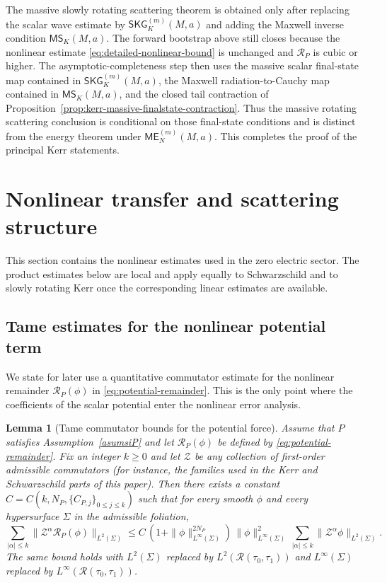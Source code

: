 \documentclass[11pt]{article}
\numberwithin{equation}{section}
\theoremstyle{plain}
\newtheorem{lemma}[theorem]{Lemma}
\theoremstyle{definition}
\theoremstyle{remark}
\newcommand{\SKG}{\mathsf{SKG}}
\newcommand{\ME}{\mathsf{ME}}
\newcommand{\MScat}{\mathsf{MS}}
\begin{document}
The massive slowly rotating scattering theorem is obtained only after replacing the scalar wave estimate by \(\SKG^{(m)}_K(M,a)\) and adding the Maxwell inverse condition \(\MScat_K(M,a)\).  The forward bootstrap above still closes because the nonlinear estimate \eqref{eq:detailed-nonlinear-bound} is unchanged and \(\mathcal R_P\) is cubic or higher.  The asymptotic-completeness step then uses the massive scalar final-state map contained in \(\SKG^{(m)}_K(M,a)\), the Maxwell radiation-to-Cauchy map contained in \(\MScat_K(M,a)\), and the closed tail contraction of Proposition~\ref{prop:kerr-massive-finalstate-contraction}.  Thus the massive rotating scattering conclusion is conditional on those final-state conditions and is distinct from the energy theorem under \(\ME_N^{(m)}(M,a)\).  This completes the proof of the principal Kerr statements.

\section{Nonlinear transfer and scattering structure}\label{sec:charged-intro-proofs}

This section contains the nonlinear estimates used in the zero electric sector.  The product estimates below are local and apply equally to Schwarzschild and to slowly rotating Kerr once the corresponding linear estimates are available.

\subsection{Tame estimates for the nonlinear potential term}\label{subsec:potential-tame}
We state for later use a quantitative commutator estimate for the nonlinear remainder $\mathcal R_{P}(\phi)$ in \eqref{eq:potential-remainder}. This is the only point where the coefficients of the scalar potential enter the nonlinear error analysis.

\begin{lemma}[Tame commutator bounds for the potential force]\label{lem:potential-tame}
Assume that $P$ satisfies Assumption~\ref{asumsiP} and let $\mathcal R_{P}(\phi)$ be defined by \eqref{eq:potential-remainder}.
Fix an integer $k\ge 0$ and let $\mathcal Z$ be any collection of \emph{first-order} admissible commutators (for instance, the families used in the Kerr and Schwarzschild parts of this paper).
Then there exists a constant $C=C(k,N_{P},\{C_{P,j}\}_{0\le j\le k})$ such that for every smooth $\phi$ and every hypersurface $\Sigma$ in the admissible foliation,
\begin{equation}\label{eq:potential-tame-L2}
\sum_{|\alpha|\le k}\|\mathcal Z^{\alpha}\mathcal R_{P}(\phi)\|_{L^{2}(\Sigma)}
\le
C\,(1+\|\phi\|_{L^{\infty}(\Sigma)}^{2N_{P}})\,\|\phi\|_{L^{\infty}(\Sigma)}^{2}\,
\sum_{|\alpha|\le k}\|\mathcal Z^{\alpha}\phi\|_{L^{2}(\Sigma)}.
\end{equation}
The same bound holds with $L^{2}(\Sigma)$ replaced by $L^{2}(\mathcal R(\tau_{0},\tau_{1}))$ and $L^{\infty}(\Sigma)$ replaced by $L^{\infty}(\mathcal R(\tau_{0},\tau_{1}))$.
\end{lemma}
\end{document}
